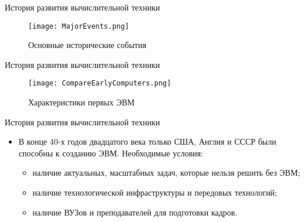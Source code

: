 \documentclass[aspectratio=169,14pt]{beamer}
\begin{document}
\begin{frame}{История развития вычислительной техники}
    \begin{figure}[htp]
        \centering
        \texttt{[image: MajorEvents.png]}
        \caption{\scriptsize{Основные исторические события}}
        \label{fig:MajorEvents}
    \end{figure}
\end{frame}

\begin{frame}{История развития вычислительной техники}
    \begin{figure}[htp]
        \centering
        \texttt{[image: CompareEarlyComputers.png]}
        \caption{\scriptsize{Характеристики первых ЭВМ}}
        \label{fig:CompareEarlyComputers}
    \end{figure}
\end{frame}

\begin{frame}{История развития вычислительной техники}
    \begin{itemize}
        \item В конце 40-х годов двадцатого века только США, Англия и СССР
        были способны к созданию ЭВМ. Необходимые условия:
        \begin{itemize}
            \item наличие актуальных, масштабных задач, которые нельзя решить без ЭВМ;
            \item наличие технологической инфраструктуры и передовых технологий;
            \item наличие ВУЗов и преподавателей для подготовки кадров.
        \end{itemize}
    \end{itemize}
\end{frame}
\end{document}
